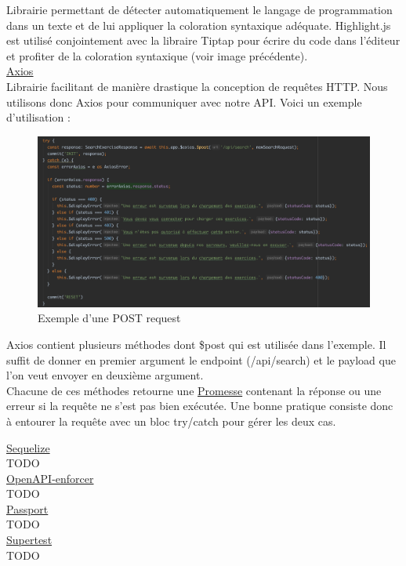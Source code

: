 Librairie permettant de détecter automatiquement le langage de programmation dans un texte et de lui appliquer la coloration syntaxique adéquate. Highlight.js est utilisé conjointement avec la libraire Tiptap pour écrire du code dans l'éditeur et profiter de la coloration syntaxique (voir image précédente).\\

\noindent\underline{\href{https://axios.nuxtjs.org/}{Axios}}\\

Librairie facilitant de manière drastique la conception de requêtes HTTP. Nous utilisons donc Axios pour communiquer avec notre API. Voici un exemple d'utilisation : \\

\begin{figure}[H]
    \includegraphics[width=\textwidth,height=0.35\textheight,keepaspectratio]{images/libraries/axios.png}
    \centering
    \caption[Axios : Exemple d'utilisation]{Exemple d'une POST request}
\end{figure}

Axios contient plusieurs méthodes dont \$post qui est utilisée dans l'exemple. Il suffit de donner en premier argument le endpoint (/api/search) et le payload que l'on veut envoyer en deuxième argument.\\

Chacune de ces méthodes retourne une \href{https://developer.mozilla.org/fr/docs/Web/JavaScript/Guide/Utiliser_les_promesses}{Promesse} contenant la réponse ou une erreur si la requête ne s'est pas bien exécutée. Une bonne pratique consiste donc à entourer la requête avec un bloc try/catch pour gérer les deux cas.\\


\noindent\underline{Sequelize}\\

TODO \\

\noindent\underline{OpenAPI-enforcer}\\

TODO \\


\noindent\underline{Passport}\\

TODO \\

\noindent\underline{Supertest}\\

TODO \\